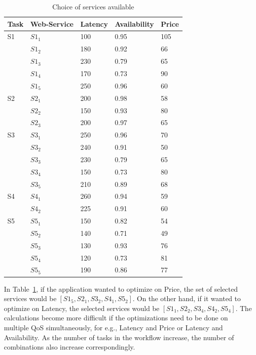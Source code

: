 \documentclass[10pt,journal,compsoc]{IEEEtran}
\begin{document}
 \begin{table} \footnotesize
	\centering
	\begin{tabular}{lllll}
\toprule
   \small{\textbf{Task}} &   \textbf{Web-Service} &   \textbf{Latency} &   \textbf{Availability} &   \textbf{Price}\\ 
\midrule
S1 
 & $S1_{1}$ & 100 & 0.95 & 105\\
 & $S1_{2}$ & 180 & 0.92 & 66\\
 & $S1_{3}$ & 230 & 0.79 & 65\\
 & $S1_{4}$ & 170 & 0.73 & 90\\
 & $S1_{5}$ & 250 & 0.96 & 60\\ 

S2 
 & $S2_{1}$ & 200 & 0.98 & 58\\
 & $S2_{2}$ & 150 & 0.93 & 80\\
 & $S2_{3}$ & 200 & 0.97 & 65\\ 
 

S3
 & $S3_{1}$ & 250 & 0.96 & 70\\
 & $S3_{2}$ & 240 & 0.91 & 50\\
 & $S3_{3}$ & 230 & 0.79 & 65\\ 
 & $S3_{4}$ & 150 & 0.73 & 80\\
 & $S3_{5}$ & 210 & 0.89 & 68\\ 

S4
 & $S4_{1}$ & 260 & 0.94 & 59\\
 & $S4_{2}$ & 225 & 0.91 & 60\\

S5
 & $S5_{1}$ & 150 & 0.82 & 54\\
 & $S5_{2}$ & 140 & 0.71 & 49\\
 & $S5_{3}$ & 130 & 0.93 & 76\\ 
 & $S5_{4}$ & 120 & 0.73 & 81\\
 & $S5_{5}$ & 190 & 0.86 & 77\\ 

\bottomrule

\end{tabular}
\caption{Choice of services available \label{tbl:choice-of-services}}
\end{table} 
 

 In Table~\ref{tbl:choice-of-services}, if the application wanted to optimize on Price, the set of selected services would be $[S1_{5}, S2_{1}, S3_{2}, S4_{1}, S5_{2}]$. On the other hand, if it wanted to optimize on Latency, the selected services would be $[S1_{1}, S2_{2}, S3_{4}, S4_{2}, S5_{4}]$. The calculations become more difficult if the optimizations need to be done on multiple QoS simultaneously, for e.g., Latency and Price or Latency and Availability. As the number of tasks in the workflow increase, the number of combinations also increase correspondingly.
\end{document}
